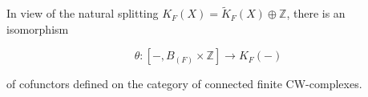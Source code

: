 In view of the natural splitting $K_F(X) = \tilde{K}_F(X) \oplus \mathbb{Z}$, there is an isomorphism

$$\theta: [-, B_{(F)} \times \mathbb{Z}] \rightarrow K_F(-)$$

of cofunctors defined on the category of connected finite CW-complexes.
